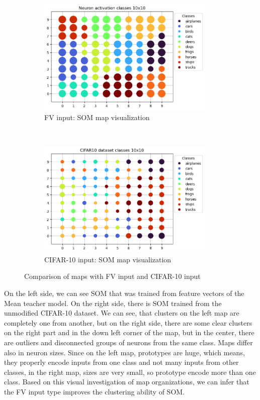 \begin{figure}[h!]
    \centering
    \begin{subfigure}[t]{0.4\textwidth}
        \centering
        \includegraphics[height=2.2in]{figs/fv-10n-84ep.png}
        \caption{FV input: SOM map visualization}
    \end{subfigure}%
    ~ 
    \begin{subfigure}[t]{0.6\textwidth}
        \centering
        \includegraphics[height=2.2in]{figs/cifar10-10n-84ep-new.png}
        \caption{CIFAR-10 input: SOM map visualization}
    \end{subfigure}

    \caption{Comparison of maps with FV input and CIFAR-10 input}
    \label{cifar10-fv-85ep}
\end{figure}


On the left side, we can see SOM that was trained from feature vectors of the Mean teacher model. On the right side, there is SOM trained from the unmodified CIFAR-10 dataset. We can see, that clusters on the left map are completely one from another, but on the right side, there are some clear clusters on the right part and in the down left corner of the map, but in the center, there are outliers and disconnected groups of neurons from the same class. Maps differ also in neuron sizes. Since on the left map, prototypes are huge, which means, they properly encode inputs from one class and not many inputs from other classes, in the right map, sizes are very small, so prototype encode more than one class. Based on this visual investigation of map organizations, we can infer that the FV input type improves the clustering ability of SOM.

